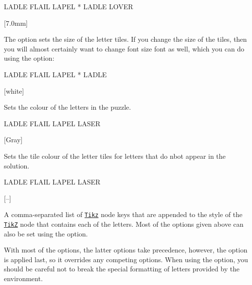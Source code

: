 \documentclass[svgnames]{report}
\newcommand\ctan[1]{\href{https://www.ctan.org/pkg/#1}{\texttt{#1}}}
\begin{document}
  \begin{example}
    \begin{wordle}[shape=circle]{LADLE}
       FLAIL LAPEL * LADLE LOVER
    \end{wordle}
  \end{example}

  [7.0mm]

  The  option sets the size of the 
  letter tiles.  If you change the size  of the tiles, then you will
  almost certainly want to change font size font as well, which you can
  do using the  option:

  \begin{example}
    \begin{wordle}[size=10mm, font=\huge\bfseries]{LADLE}
       FLAIL LAPEL * LADLE
    \end{wordle}
  \end{example}

  [white]

  Sets the colour of the letters in the  puzzle.

  \begin{example}
    \begin{wordle}[text=DarkSlateGrey]{LADLE}
       FLAIL LAPEL LASER
    \end{wordle}
  \end{example}

  [Gray]

  Sets the tile colour of the  letter tiles for letters
  that do nbot appear in the solution.

  \begin{example}
    \begin{wordle}[wrong=red]{LADLE}
       FLAIL LAPEL LASER
    \end{wordle}
  \end{example}

  [--]

  A comma-separated list of \ctan{Tikz} node keys that are appended to
  the style of the \ctan{TikZ} node that contains each of the
   letters.  Most of the options given above can also be
  set using the  option.

  With most of the  options, the latter options take
  precedence, however, the  option is applied last,
  so it overrides any competing options. When using the
   option, you should be careful not to break the
  special formatting of letters provided by the 
  environment.\par
\end{document}
